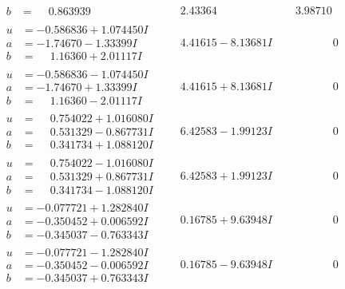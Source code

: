 \documentclass[1p]{elsarticle_modified}
\theoremstyle{definition}
\begin{document}
$$\begin{array}{c|c|c}
\begin{aligned}
b &= \phantom{-}0.863939\phantom{ +0.000000I}\end{aligned}
 & \phantom{-}2.43364\phantom{ +0.000000I} & \phantom{-}3.98710\phantom{ +0.000000I} \\ \hline\begin{aligned}
u &= -0.586836 + 1.074450 I \\
a &= -1.74670 - 1.33399 I \\
b &= \phantom{-}1.16360 + 2.01117 I\end{aligned}
 & \phantom{-}4.41615 - 8.13681 I & \phantom{-0.000000 } 0 \\ \hline\begin{aligned}
u &= -0.586836 - 1.074450 I \\
a &= -1.74670 + 1.33399 I \\
b &= \phantom{-}1.16360 - 2.01117 I\end{aligned}
 & \phantom{-}4.41615 + 8.13681 I & \phantom{-0.000000 } 0 \\ \hline\begin{aligned}
u &= \phantom{-}0.754022 + 1.016080 I \\
a &= \phantom{-}0.531329 - 0.867731 I \\
b &= \phantom{-}0.341734 + 1.088120 I\end{aligned}
 & \phantom{-}6.42583 - 1.99123 I & \phantom{-0.000000 } 0 \\ \hline\begin{aligned}
u &= \phantom{-}0.754022 - 1.016080 I \\
a &= \phantom{-}0.531329 + 0.867731 I \\
b &= \phantom{-}0.341734 - 1.088120 I\end{aligned}
 & \phantom{-}6.42583 + 1.99123 I & \phantom{-0.000000 } 0 \\ \hline\begin{aligned}
u &= -0.077721 + 1.282840 I \\
a &= -0.350452 + 0.006592 I \\
b &= -0.345037 - 0.763343 I\end{aligned}
 & \phantom{-}0.16785 + 9.63948 I & \phantom{-0.000000 } 0 \\ \hline\begin{aligned}
u &= -0.077721 - 1.282840 I \\
a &= -0.350452 - 0.006592 I \\
b &= -0.345037 + 0.763343 I\end{aligned}
 & \phantom{-}0.16785 - 9.63948 I & \phantom{-0.000000 } 0 \\ \hline\begin{aligned}

\end{aligned}
\end{array}$$
\end{document}
